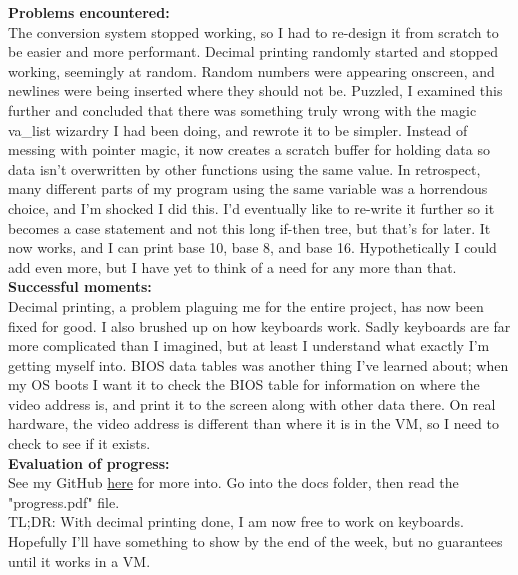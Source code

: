 \documentclass[11pt]{article}
\begin{document}
\textbf{Problems encountered:}\\
The conversion system stopped working, so I had to re-design it from scratch to be easier and more performant. Decimal printing randomly started and stopped working, seemingly at random. Random numbers were appearing onscreen, and newlines were being inserted where they should not be. Puzzled, I examined this further and concluded that there was something truly wrong with the magic va\_list wizardry I had been doing, and rewrote it to be simpler. Instead of messing with pointer magic, it now creates a scratch buffer for holding data so data isn't overwritten by other functions using the same value. In retrospect, many different parts of my program using the same variable was a horrendous choice, and I'm shocked I did this. I'd eventually like to re-write it further so it becomes a case statement and not this long if-then tree, but that's for later. It now works, and I can print base 10, base 8, and base 16. Hypothetically I could add even more, but I have yet to think of a need for any more than that.\\
\textbf{Successful moments:}\\
Decimal printing, a problem plaguing me for the entire project, has now been fixed for good. I also brushed up on how keyboards work. Sadly keyboards are far more complicated than I imagined, but at least I understand what exactly I'm getting myself into. BIOS data tables was another thing I've learned about; when my OS boots I want it to check the BIOS table for information on where the video address is, and print it to the screen along with other data there. On real hardware, the video address is different than where it is in the VM, so I need to check to see if it exists.\\
\textbf{Evaluation of progress:}\\
See my GitHub \href{https://github.com/cats64/ibpersonalproject}{here} for more into. Go into the docs folder, then read the "progress.pdf" file.\\
TL;DR: With decimal printing done, I am now free to work on keyboards. Hopefully I'll have something to show by the end of the week, but no guarantees until it works in a VM.
\end{document}
